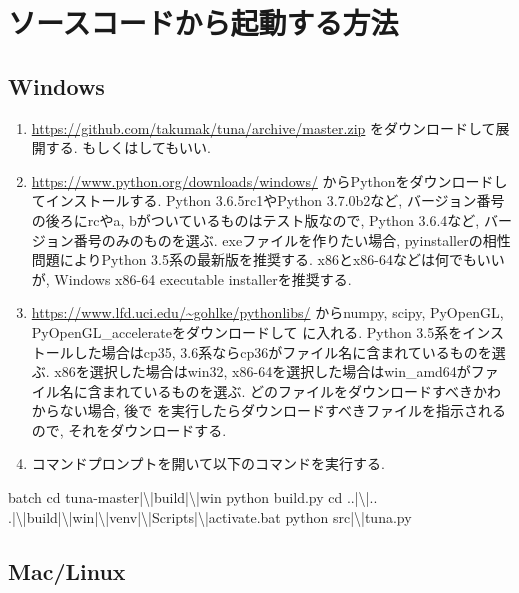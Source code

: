 \clearpage
\section{ソースコードから起動する方法}

\subsection{Windows}

\begin{enumerate}
\item \url{https://github.com/takumak/tuna/archive/master.zip}
  をダウンロードして展開する.
  もしくはしてもいい.
\item \url{https://www.python.org/downloads/windows/}
  からPythonをダウンロードしてインストールする.
  Python 3.6.5rc1やPython 3.7.0b2など, バージョン番号の後ろにrcやa, bがついているものはテスト版なので,
  Python 3.6.4など, バージョン番号のみのものを選ぶ.
  exeファイルを作りたい場合, pyinstallerの相性問題によりPython 3.5系の最新版を推奨する.
  x86とx86-64などは何でもいいが, Windows x86-64 executable installerを推奨する.
\item \url{https://www.lfd.uci.edu/~gohlke/pythonlibs/}
  からnumpy, scipy, PyOpenGL, PyOpenGL\_accelerateをダウンロードして
   に入れる.
  Python 3.5系をインストールした場合はcp35, 3.6系ならcp36がファイル名に含まれているものを選ぶ.
  x86を選択した場合はwin32, x86-64を選択した場合はwin\_amd64がファイル名に含まれているものを選ぶ.
  どのファイルをダウンロードすべきかわからない場合, 後で 
  を実行したらダウンロードすべきファイルを指示されるので, それをダウンロードする.
\item コマンドプロンプトを開いて以下のコマンドを実行する.
\end{enumerate}

\begin{codeb}{batch}
  cd tuna-master|\textbackslash|build|\textbackslash|win
  python build.py
  cd ..|\textbackslash|..
  .|\textbackslash|build|\textbackslash|win|\textbackslash|venv|\textbackslash|Scripts|\textbackslash|activate.bat
  python src|\textbackslash|tuna.py
\end{codeb}

\subsection{Mac/Linux}

